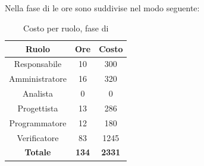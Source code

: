 \subsection{\VV}
Nella fase di \VV{} le ore sono suddivise nel modo seguente:
\begin{table}[H]
	\centering
	\begin{tabular}{|c|c|c|}
		\hline
		\textbf{Ruolo} &
		\textbf{Ore} &
		\textbf{Costo} \\
		\hline
		Responsabile & 10 & 300\\
		\hline
		Amministratore & 16 & 320\\
		\hline
		Analista & 0 & 0\\
		\hline
		Progettista & 13 & 286 \\
		\hline
		Programmatore & 12 & 180 \\
		\hline
		Verificatore & 83 & 1245\\
		\hline
		\textbf{Totale} & \textbf{134} & \textbf{2331} \\
		\hline
	\end{tabular}
	\caption{Costo per ruolo, fase di \VV}
\end{table}

